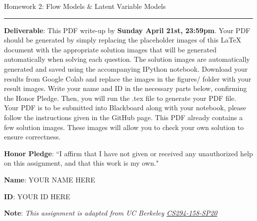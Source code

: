 \documentclass{article}
\newcommand{\ruleskip}{\bigskip\hrule\bigskip}
\begin{document}
\pagestyle{myheadings} 

{\huge
\noindent Homework 2: Flow Models \& Latent Variable Models}
\ruleskip

{\bf Deliverable}: This PDF write-up by {\bf Sunday April 21st, 23:59pm}.  Your PDF should be generated by simply replacing the placeholder images of this LaTeX document with the appropriate solution images that will be generated automatically when solving each question. The solution images are automatically generated and saved using the accompanying IPython notebook.  Download your results from Google Colab and replace the images in the figures/ folder with your result images. Write your name and ID in the necessary parts below, confirming the Honor Pledge. Then, you will run the .tex file to generate your PDF file. Your PDF is to be submitted into Blackboard along with your notebook, please follow the instructions given in the GitHub page. This PDF already contains a few solution images.  These images will allow you to check your own solution to ensure correctness.

{\bf Honor Pledge}: ``I affirm that I have not given or received any unauthorized help on this assignment, and that this work is my own."

{\bf Name}: YOUR NAME HERE

{\bf ID}: YOUR ID HERE

\vspace{.1in}

{\bf Note}: \textit{This assignment is adapted from UC Berkeley \href{https://sites.google.com/view/berkeley-cs294-158-sp20/home}{CS294-158-SP20}}
\vspace{.2in}

\end{document}

